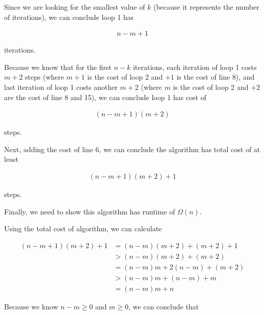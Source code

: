 \documentclass[12pt]{article}
\begin{document}
\begin{enumerate}[a.]
\begin{mdframed}
        \bigskip

        Since we are looking for the smallest value of $k$ (because it represents the
        number of iterations), we can conclude loop 1 has

        \begin{align}
            n-m+1
        \end{align}

        iterations.

        \bigskip

        Because we know that for the first $n-k$ iterations, each iteration of loop 1
        costs $m + 2$ steps (where $m+1$ is the cost of loop 2 and $+1$ is the cost
        of line 8), and last iteration of loop 1 costs another $m + 2$ (where $m$
        is the cost of loop 2 and $+2$ are the cost of line 8 and 15), we can conclude
        loop 1 has cost of

        \begin{align}
            (n-m+1)(m+2)
        \end{align}

        steps.

        \bigskip

        Next, adding the cost of line 6, we can conclude the algorithm has total
        cost of at least

        \begin{align}
            (n-m+1)(m+2) + 1
        \end{align}

        steps.

        \bigskip

        Finally, we need to show this algorithm has runtime of $\Omega(n)$.

        \bigskip

        Using the total cost of algorithm, we can calculate

        \begin{align}
            (n-m+1)(m+2) + 1 &= (n-m)(m+2) + (m+2) + 1\\
            &> (n-m)(m+2) + (m+2)\\
            &= (n-m)m + 2(n-m) + (m+2)\\
            &> (n-m)m + (n-m) + m\\
            &= (n-m)m + n
        \end{align}

        \bigskip

        Because we know $n - m \geq 0$ and $m \geq 0$, we can conclude that


\end{mdframed}
\end{enumerate}
\end{document}
